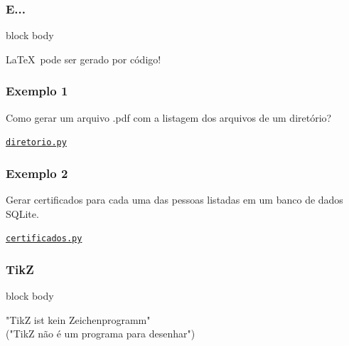 \documentclass{beamer}
\begin{document}
\begin{frame}
   \frametitle{E...}
      \begin{center}
         \begin{minipage}{6cm}
         \begin{beamercolorbox}[sep=1em]{block body}
           \begin{center}
             \LaTeX\ pode ser gerado por código!
           \end{center}
         \end{beamercolorbox}
         \end{minipage}
      \end{center}
\end{frame}
\begin{frame}
   \frametitle{Exemplo 1}
   Como gerar um arquivo .pdf com a listagem dos arquivos de um diretório?
   \begin{center}
      \href{diretorio.py}{\tt{diretorio.py}}
   \end{center}
\end{frame}
\begin{frame}
   \frametitle{Exemplo 2}
   Gerar certificados para cada uma das pessoas listadas em um banco de dados SQLite.
   \begin{center}
      \href{certificados.py}{\tt{certificados.py}}
   \end{center}
\end{frame}
\begin{frame}
  \frametitle{TikZ}
  \begin{center}
    \begin{minipage}{8cm}
      \begin{beamercolorbox}[sep=1em,wd=8cm]{block body}
        \begin{center}
          "TikZ ist kein Zeichenprogramm" \\("TikZ não é um programa para desenhar")
        \end{center}
      \end{beamercolorbox}
      \end{minipage}
   \end{center}
\end{frame}
\end{document}
